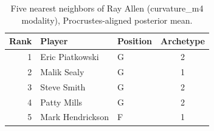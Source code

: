 \begin{table}[htbp]
  \centering\small
  \begin{tabular}{rllc}
    \toprule
    Rank & Player & Position & Archetype \\
    \midrule
    1 & Eric Piatkowski & G & 2 \\
    2 & Malik Sealy & G & 1 \\
    3 & Steve Smith & G & 2 \\
    4 & Patty Mills & G & 2 \\
    5 & Mark Hendrickson & F & 1 \\
    \bottomrule
  \end{tabular}
  \caption{Five nearest neighbors of Ray Allen (curvature_m4 modality), Procrustes-aligned posterior mean.}
  \label{tab:Ray_Allen_neighbors_curvature_m4}
\end{table}


